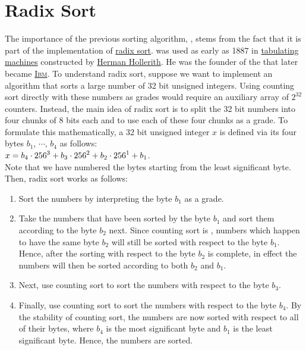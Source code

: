 \section{Radix Sort}
The importance of the previous sorting algorithm, , stems from the fact that it is part of the
implementation of \href{https://en.wikipedia.org/wiki/Radix_sort}{radix sort}. 
 was used as early as 1887 in 
\href{https://en.wikipedia.org/wiki/Tabulating_machine}{tabulating machines} constructed by
\href{https://en.wikipedia.org/wiki/Herman_Hollerith}{Herman Hollerith}.   He was the founder of
the  that later became \href{https://en.wikipedia.org/wiki/IBM}{\textsc{Ibm}}.
To understand radix sort, suppose we want to implement an algorithm that sorts a large number of 32 bit
unsigned integers.  Using counting sort directly with these numbers as grades would require an auxiliary
array of $2^{32}$ counters.  Instead, the main idea of radix sort is to split the
32 bit numbers into four chunks of 8 bits each and to use each of these four chunks as a grade.  To formulate this
mathematically, a 32 bit unsigned integer $x$ is defined via its four bytes $b_1$, $\cdots$, $b_4$ as follows:
\\[0.2cm]
\hspace*{1.3cm}
$\displaystyle x = b_4 \cdot 256^{3} + b_3 \cdot 256^{2} + b_2 \cdot 256^{1} + b_1$.
\\[0.2cm]
Note that we have numbered the bytes starting from the least significant byte.
Then, radix sort works as follows:
\begin{enumerate}
\item Sort the numbers by interpreting the byte $b_1$ as a grade.
\item Take the numbers that have been sorted by the byte $b_1$ and sort them according to the byte $b_2$ next.
      Since counting sort is , numbers which happen to have the same byte $b_2$ will still be
      sorted with respect to the byte $b_1$.  Hence, after the sorting with respect to the byte $b_2$ is
      complete, in effect the numbers will then be sorted according to both $b_2$ and $b_1$.
\item Next, use counting sort to sort the numbers with respect to the byte $b_3$.
\item Finally, use counting sort to sort the numbers with respect to the byte $b_4$.  By the stability of
      counting sort, the numbers are now sorted with respect to all of their bytes, where $b_4$ is the most
      significant byte and $b_1$ is the least significant byte. Hence, the numbers are sorted. 
\end{enumerate}


